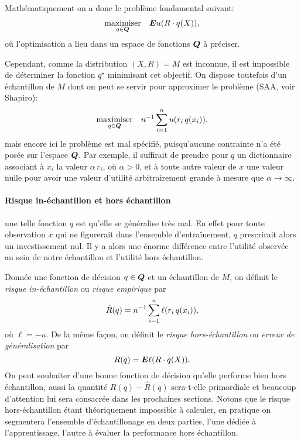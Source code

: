 Mathématiquement on a donc le problème fondamental suivant:
\begin{equation}
  \maximizeEquation[q \in \Q]{\E u(R \cdot q(X)),}
\end{equation}
où l'optimisation a lieu dans un espace de fonctions $\Q$ à préciser.

Cependant, comme la distribution $(X,R) = M$ est inconnue, il est impossible de déterminer
la fonction $q^\star$ minimisant cet objectif. On dispose toutefois d'un échantillon de
$M$ dont on peut se servir pour approximer le problème (SAA, voir Shapiro\cit):
\begin{equation}
  \maximizeEquation[q \in \Q]{n^{-1} \sumi u(r_i\, q(x_i)),}
\end{equation}
mais encore ici le problème est mal spécifié, puisqu'aucune contrainte n'a été posée sur
l'espace $\Q$. Par exemple, il suffirait de prendre pour $q$ un dictionnaire associant à
$x_i$ la valeur $\alpha\,r_i$, où $\alpha > 0$, et à toute autre valeur de $x$ une valeur nulle pour
avoir une valeur d'utilité arbitrairement grande à mesure que $\alpha \to \infty$.


\paragraph{Risque in-échantillon et hors échantillon}

 une telle fonction $q$ est qu'elle se généralise très mal. En effet
pour toute observation $x$ qui ne figurerait dans l'ensemble d'entraînement, $q$
prescrirait alors un investissement nul. Il y a alors une énorme différence entre
l'utilité observée au sein de notre échantillon et l'utilité hors échantillon.

Donnée une fonction de décision $q \in \Q$ et un échantillon de $M$, on définit le
\textit{risque in-échantillon} ou \textit{risque empirique} par
\begin{equation}
  \hat R(q) = n^{-1}\sumi \ell(r_i\,q(x_i)),
\end{equation}
où $\ell = -u$. De la même façon, on définit le \textit{risque hors-échantillon} ou
\textit{erreur de généralisation} par
\begin{equation}
  R(q) = \E \ell(R \cdot q(X)).
\end{equation}
On peut souhaiter d'une bonne fonction de décision qu'elle performe bien hors échantillon,
aussi la quantité $R(q) - \hat R(q)$ sera-t-elle primordiale et beaucoup d'attention lui
sera consacrée dans les prochaines sections. Notons que le risque hors-échantillon étant
théoriquement impossible à calculer, en pratique on segmentera l'ensemble d'échantillonage
en deux parties, l'une dédiée à l'apprentissage, l'autre à évaluer la performance hors
échantillon.



